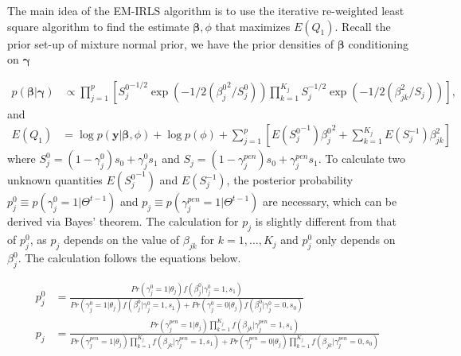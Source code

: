 \documentclass[AMA,STIX1COL,]{WileyNJD-v2}
\begin{document}
The main idea of the EM-IRLS algorithm is to use the iterative
re-weighted least square algorithm to find the estimate
\(\boldsymbol{\beta}, \phi\) that maximizes \(E(Q_1)\). Recall the prior
set-up of mixture normal prior, we have the prior densities of
\(\boldsymbol{\beta}\) conditioning on \(\boldsymbol{\gamma}\)

\[
\begin{aligned}
p(\boldsymbol{\beta }| \boldsymbol{\gamma}) &\propto \prod\limits_{j=1}^{p}\left[{S^0_j}^{-1/2}\exp(-1/2({\beta^0_{j}}^2/S^0_{j}))\prod\limits_{k=1}^{K_j}S_{j}^{-1/2}\exp(-1/2(\beta_{jk}^2/S_{j}))\right],%
\end{aligned}
\] and \[
\begin{aligned}
E(Q_1) &= \log p(\textbf{y}|\boldsymbol{\beta}, \phi) + \log p(\phi) + \sum\limits_{j=1}^p\left[E({S^0_j}^{-1}){\beta^0_j}^2+\sum\limits_{k=1}^{K_j}E(S^{-1}_{j})\beta_{jk}^2\right]%
\end{aligned}
\] where \(S_{j}^0 = (1-\gamma^{0}_{j}) s_0 + \gamma^{0}_{j} s_1\) and
\(S_{j} = (1-\gamma^{pen}_{j}) s_0 + \gamma^{pen}_{j} s_1\). To
calculate two unknown quantities \(E({S_j^0}^{-1})\) and
\(E(S^{-1}_j)\), the posterior probability
\(p^0_{j} \equiv p(\gamma^{0}_{j}=1|\Theta^{t-1})\) and
\(p_{j} \equiv p(\gamma^{pen}_{j}=1|\Theta^{t-1})\) are necessary, which
can be derived via Bayes' theorem. The calculation for \(p_j\) is
slightly different from that of \(p^0_j\), as \(p_j\) depends on the
value of \(\beta_{jk}\) for \(k=1, \dots, K_j\) and \(p^0_j\) only
depends on \(\beta_j^0\). The calculation follows the equations below.

\[
\begin{aligned}
p_{j}^0 &= \frac{Pr(\gamma_{j}^0 = 1|\theta_j)f(\beta_{j}^0|\gamma_{j}^0=1, s_1) }{Pr(\gamma_{j}^0 = 1|\theta_j)f(\beta_{j}^0|\gamma_{j}^0=1, s_1) + Pr(\gamma_{j}^0 = 0|\theta_j)f(\beta^0_{j}|\gamma^0_{j}=0, s_0)}\\
p_{j} &= \frac{Pr(\gamma^{pen}_{j} = 1|\theta_j)\prod\limits_{k=1}^{K_j}f(\beta_{jk}|\gamma^{pen}_{j}=1, s_1) }{Pr(\gamma^{pen}_{j} = 1|\theta_j)\prod\limits_{k=1}^{K_j}f(\beta_{jk}|\gamma^{pen}_{j}=1, s_1) + Pr(\gamma^{pen}_{j} = 0|\theta_j)\prod\limits_{k=1}^{K_j}f(\beta_{jk}|\gamma^{pen}_{j}=0, s_0)}
\end{aligned}
\]
\end{document}
